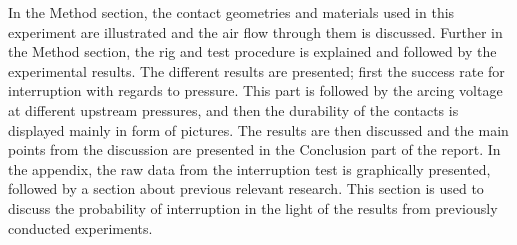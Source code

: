 \documentclass[10pt,a4paper,twoside]{article}
\begin{document}
In the Method section, the contact geometries and materials used in this experiment are illustrated and the air flow through them is discussed. Further in the Method section, the rig and test procedure is explained and followed by the experimental results. The different results are presented; first the success rate for interruption with regards to pressure. This part is followed by the arcing voltage at different upstream pressures, and then the durability of the contacts is displayed mainly in form of pictures. The results are then discussed and the main points from the discussion are presented in the Conclusion part of the report. In the appendix, the raw data from the interruption test is graphically presented, followed by a section about previous relevant research. This section is used to discuss the probability of interruption in the light of the results from previously conducted experiments.
\end{document}
